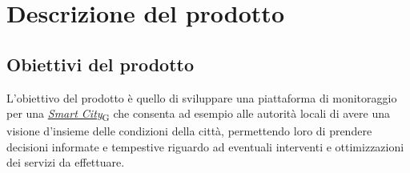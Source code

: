 \section{Descrizione del prodotto}
\subsection{Obiettivi del prodotto}
L'obiettivo del prodotto è quello di sviluppare una piattaforma di monitoraggio per una \href{https://7last.github.io/docs/rtb/documentazione-interna/glossario\#smart-city}{\textit{Smart City}\textsubscript{G}} che consenta
ad esempio alle autorità locali di avere una visione d'insieme delle condizioni della città, permettendo loro
di prendere decisioni informate e tempestive riguardo ad eventuali interventi e ottimizzazioni dei servizi da effettuare.

